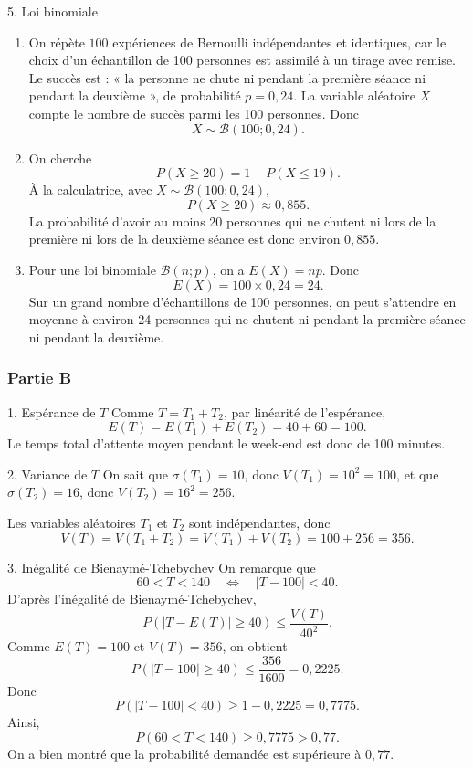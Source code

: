 \documentclass[11pt,a4paper]{article}
\begin{document}
\begin{correctionbox}{5. Loi binomiale}
\begin{enumerate}
  \item On répète $100$ expériences de Bernoulli indépendantes et identiques, car le choix d'un échantillon de 100 personnes est assimilé à un tirage avec remise. Le succès est : « la personne ne chute ni pendant la première séance ni pendant la deuxième », de probabilité $p=0{,}24$. La variable aléatoire $X$ compte le nombre de succès parmi les 100 personnes. Donc
  \[
  X\sim\mathcal B(100;0{,}24).
  \]

  \item On cherche
  \[
  P(X\geqslant20)=1-P(X\leqslant19).
  \]
  À la calculatrice, avec $X\sim\mathcal B(100;0{,}24)$,
  \[
  P(X\geqslant20)\approx0{,}855.
  \]
  La probabilité d'avoir au moins 20 personnes qui ne chutent ni lors de la première ni lors de la deuxième séance est donc environ $0{,}855$.

  \item Pour une loi binomiale $\mathcal B(n;p)$, on a $E(X)=np$. Donc
  \[
  E(X)=100\times0{,}24=24.
  \]
  Sur un grand nombre d'échantillons de 100 personnes, on peut s'attendre en moyenne à environ 24 personnes qui ne chutent ni pendant la première séance ni pendant la deuxième.
\end{enumerate}
\end{correctionbox}

\subsubsection*{Partie B}

\begin{correctionbox}{1. Espérance de $T$}
Comme $T=T_1+T_2$, par linéarité de l'espérance,
\[
E(T)=E(T_1)+E(T_2)=40+60=100.
\]
Le temps total d'attente moyen pendant le week-end est donc de 100 minutes.
\end{correctionbox}

\begin{correctionbox}{2. Variance de $T$}
On sait que $\sigma(T_1)=10$, donc $V(T_1)=10^2=100$, et que $\sigma(T_2)=16$, donc $V(T_2)=16^2=256$.

Les variables aléatoires $T_1$ et $T_2$ sont indépendantes, donc
\[
V(T)=V(T_1+T_2)=V(T_1)+V(T_2)=100+256=356.
\]
\end{correctionbox}

\begin{correctionbox}{3. Inégalité de Bienaymé-Tchebychev}
On remarque que
\[
60<T<140 \quad \Longleftrightarrow \quad |T-100|<40.
\]
D'après l'inégalité de Bienaymé-Tchebychev,
\[
P(|T-E(T)|\geqslant40)\leqslant \dfrac{V(T)}{40^2}.
\]
Comme $E(T)=100$ et $V(T)=356$, on obtient
\[
P(|T-100|\geqslant40)\leqslant \dfrac{356}{1600}=0{,}2225.
\]
Donc
\[
P(|T-100|<40)\geqslant1-0{,}2225=0{,}7775.
\]
Ainsi,
\[
P(60<T<140)\geqslant0{,}7775>0{,}77.
\]
On a bien montré que la probabilité demandée est supérieure à $0{,}77$.
\end{correctionbox}
\end{document}
